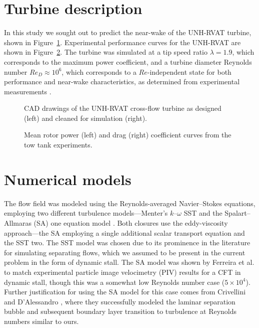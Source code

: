 \section{Turbine description}

In this study we sought out to predict the near-wake of the UNH-RVAT turbine,
shown in Figure~\ref{fig:RVAT-CAD}. Experimental performance curves for the
UNH-RVAT are shown in Figure~\ref{fig:exp_perf}. The turbine was simulated at a
tip speed ratio $\lambda=1.9$, which corresponds to the maximum power
coefficient, and a turbine diameter Reynolds number $Re_D \approx 10^6$, which
corresponds to a $Re$-independent state for both performance and near-wake
characteristics, as determined from experimental measurements \cite{Bachant2014,
    Bachant2016-Energies}.


\begin{figure}[ht]
    \centering


    \caption{CAD drawings of the UNH-RVAT cross-flow turbine as designed (left)
        and cleaned for simulation (right).}

    \label{fig:RVAT-CAD}
\end{figure}


\begin{figure}[ht]
    \centering


    \caption{Mean rotor power (left) and drag (right) coefficient curves from
        the tow tank experiments\cite{Bachant2016-RVAT-Re-dep}.}

    \label{fig:exp_perf}
\end{figure}


\section{Numerical models}

The flow field was modeled using the Reynolds-averaged Navier--Stokes equations,
employing two different turbulence models---Menter's $k$--$\omega$ SST
\cite{Menter1994} and the Spalart--Allmaras (SA) one equation model
\cite{Spalart1992}. Both closures use the eddy-viscosity approach---the SA
employing a single additional scalar transport equation and the SST two. The SST
model was chosen due to its prominence in the literature for simulating
separating flows, which we assumed to be present in the current problem in the
form of dynamic stall. The SA model was shown by Ferreira et al.
\cite{Ferreira2007} to match experimental particle image velocimetry (PIV)
results for a CFT in dynamic stall, though this was a somewhat low Reynolds
number case ($5 \times 10^4$). Further justification for using the SA model for
this case comes from Crivellini and D'Alessandro \cite{Crivellini2014}, where
they successfully modeled the laminar separation bubble and subsequent boundary
layer transition to turbulence at Reynolds numbers similar to ours.


